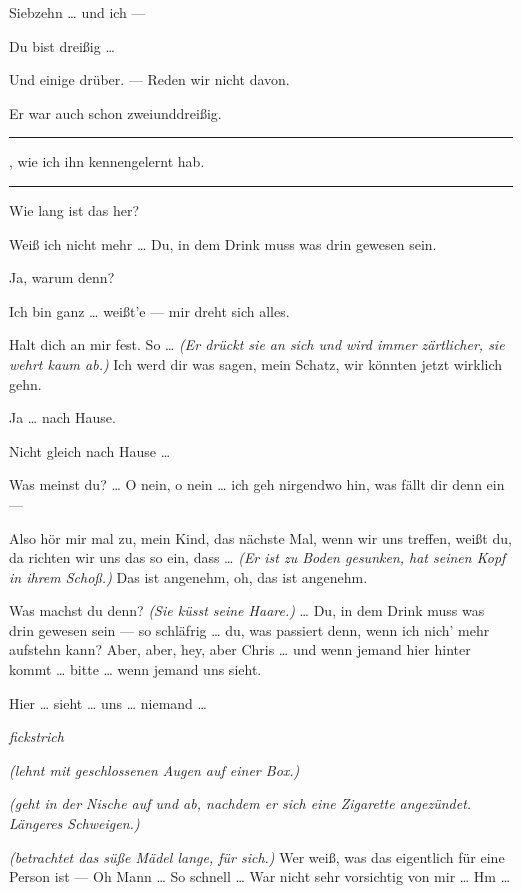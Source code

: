 \documentclass[
	final,
	a4paper,
	ngerman,
	mpinclude = true, %
	twoside = true,
	open = right,
	cleardoublepage = plain,
	DIV = 13,
	BCOR = 1cm,
	titlepage = firstiscover,
	]{scrbook}
\newcommand{\direction}[1]{\textit{(#1)}}
\newcommand{\hiat}{%
	\begin{center}
		\tiny
		\raisebox{0.5ex}{\rule{0.3\linewidth}{0.4pt}}
		\textit{fickstrich}
		\raisebox{0.5ex}{\rule{0.3\linewidth}{0.4pt}}
	\end{center}
}
\newenvironment{deletion}{%
		\vspace{0.25\baselineskip}
		\hrule
		\vspace{0.25\baselineskip}
		\color{darkgray}
	}{
		\color{black}
		\vspace{0.25\baselineskip}
		\hrule 
		\vspace{0.25\baselineskip}
	}
\newcommand{\thecharacter}[1]{\textup{\textsc{#1}}\xspace}
\newcommand{\thegatte}{\thecharacter{Christian}}
\newcommand{\thesuesse}{\thecharacter{Lola}}
\newcommand{\character}[1]{\item[#1:]}
\newcommand{\gatte}{\character{\thegatte}}
\newcommand{\suesse}{\character{\thesuesse}}
\begin{document}
\begin{play}
	\gatte
	Siebzehn \ldots{} und ich ---

	\suesse
	Du bist dreißig \ldots{}

	\gatte
	Und einige drüber. --- Reden wir nicht davon.

	\suesse
	Er war auch schon zweiunddreißig.
	\begin{deletion}
	, wie ich ihn kennengelernt hab.
	\end{deletion}

	\gatte
	Wie lang ist das her?

	\suesse
	Weiß ich nicht mehr \ldots{} Du, in dem Drink muss was drin gewesen sein.

	\gatte
	Ja, warum denn?

	\suesse
	Ich bin ganz \ldots{} weißt'e --- mir dreht sich alles.

	\gatte
	Halt dich an mir fest. So \ldots{} \direction{Er drückt sie an sich und wird immer zärtlicher, sie wehrt kaum ab.} Ich werd dir was sagen, mein Schatz, wir könnten jetzt wirklich gehn.

	\suesse
	Ja \ldots{} nach Hause.

	\gatte
	Nicht gleich nach Hause \ldots{}

	\suesse
	Was meinst du? \ldots{} O nein, o nein \ldots{} ich geh nirgendwo hin, was fällt dir denn ein ---

	\gatte
	Also hör mir mal zu, mein Kind, das nächste Mal, wenn wir uns treffen, weißt du, da richten wir uns das so ein, dass \ldots{} \direction{Er ist zu Boden gesunken, hat seinen Kopf in ihrem Schoß.} Das ist angenehm, oh, das ist angenehm.

	\suesse
	Was machst du denn? \direction{Sie küsst seine Haare.} \ldots{} Du, in dem Drink muss was drin gewesen sein --- so schläfrig \ldots{} du, was passiert denn, wenn ich nich' mehr aufstehn kann? Aber, aber, hey, aber Chris \ldots{} und wenn jemand hier hinter kommt \ldots{} bitte \ldots{} wenn jemand uns sieht.

	\gatte
	Hier \ldots{} sieht \ldots{} uns \ldots{} niemand \ldots{}

	\hiat

	\suesse
	\direction{lehnt mit geschlossenen Augen auf einer Box.}

	\gatte
	\direction{geht in der Nische auf und ab, nachdem er sich eine Zigarette angezündet. Längeres Schweigen.}

	\gatte
	\direction{betrachtet das süße Mädel lange, für sich.} Wer weiß, was das eigentlich für eine Person ist --- Oh Mann \ldots{} So schnell \ldots{} War nicht sehr vorsichtig von mir \ldots{} Hm \ldots{}


\end{play}
\end{document}
